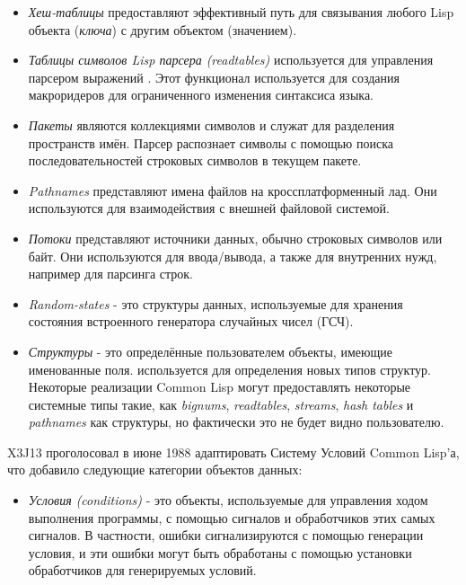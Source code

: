 \begin{itemize}
\item
\emph{Хеш-таблицы} предоставляют эффективный путь для связывания
любого Lisp объекта (\emph{ключа}) с другим объектом (значением). 

\item
\emph{Таблицы символов Lisp парсера (readtables)} используется для управления
парсером выражений . Этот функционал используется для создания
макроридеров для ограниченного изменения синтаксиса языка.

\item
\emph{Пакеты} являются коллекциями символов и служат для разделения
пространств имён. Парсер распознает символы с помощью поиска
последовательностей строковых символов в текущем пакете. 

\item
\emph{Pathnames} представляют имена файлов на кроссплатформенный
лад. Они используются для взаимодействия с внешней файловой
системой. 

\item
\emph{Потоки} представляют источники данных, обычно строковых
символов или байт. Они используются для ввода/вывода, а также для
внутренних нужд, например для парсинга строк. 

\item
\emph{Random-states} - это структуры данных, используемые для
хранения состояния встроенного генератора случайных чисел (ГСЧ).

\item
\emph{Структуры} - это определённые пользователем объекты, имеющие
именованные поля.  используется для определения
новых типов структур. Некоторые реализации Common Lisp могут
предоставлять некоторые системные типы такие, как \emph{bignums},
\emph{readtables}, \emph{streams}, \emph{hash tables} и {\it
pathnames} как структуры, но фактически это не будет видно
пользователю.
\end{itemize}

\begin{new}
X3J13 проголосовал в июне 1988 адаптировать Систему Условий Common Lisp'а,
что добавило следующие категории объектов данных: 
\begin{itemize}
\item
\emph{Условия (conditions)} - это объекты, используемые для
управления ходом выполнения программы, с помощью сигналов и
обработчиков этих самых сигналов. В частности, ошибки
сигнализируются с помощью генерации условия, и эти ошибки могут
быть обработаны с помощью установки обработчиков для генерируемых
условий.
\end{itemize}
\end{new}

